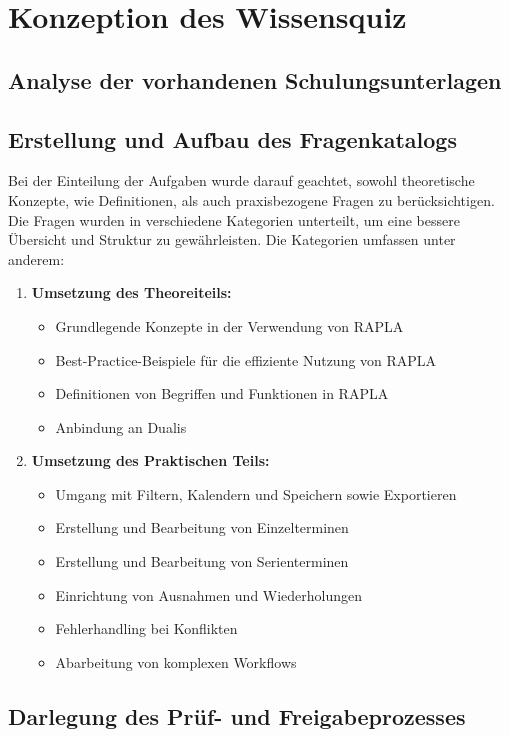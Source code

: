 \chapter{Konzeption des Wissensquiz}
\section{Analyse der vorhandenen Schulungsunterlagen}
\section{Erstellung und Aufbau des Fragenkatalogs}
Bei der Einteilung der Aufgaben wurde darauf geachtet, sowohl theoretische Konzepte, wie Definitionen, als auch praxisbezogene Fragen zu berücksichtigen. 
Die Fragen wurden in verschiedene Kategorien unterteilt, um eine bessere Übersicht und Struktur zu gewährleisten. 
Die Kategorien umfassen unter anderem:
\begin{enumerate}
    \item \textbf{Umsetzung des Theoreiteils:}
    \begin{itemize}
        \item Grundlegende Konzepte in der Verwendung von RAPLA
        \item Best-Practice-Beispiele für die effiziente Nutzung von RAPLA
        \item Definitionen von Begriffen und Funktionen in RAPLA
        \item Anbindung an Dualis
    \end{itemize}
    \item \textbf{Umsetzung des Praktischen Teils:}
    \begin{itemize}
        \item Umgang mit Filtern, Kalendern und Speichern sowie Exportieren
        \item Erstellung und Bearbeitung von Einzelterminen
        \item Erstellung und Bearbeitung von Serienterminen
        \item Einrichtung von Ausnahmen und Wiederholungen
        \item Fehlerhandling bei Konflikten
        \item Abarbeitung von komplexen Workflows
    \end{itemize}
\end{enumerate}
\section{Darlegung des Prüf- und Freigabeprozesses}
